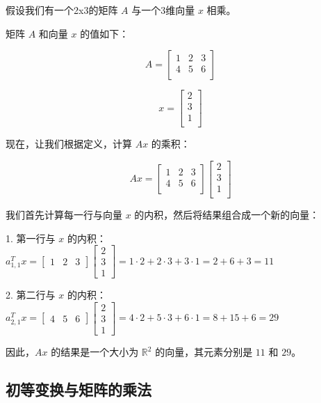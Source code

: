 \begin{exercise}
    假设我们有一个2x3的矩阵 $A$ 与一个3维向量 $x$ 相乘。

矩阵 $A$ 和向量 $x$ 的值如下：

\[
A = \begin{bmatrix}
1 & 2 & 3 \\
4 & 5 & 6 \\
\end{bmatrix}
\]

\[
x = \begin{bmatrix}
2 \\
3 \\
1 \\
\end{bmatrix}
\]

现在，让我们根据定义，计算 $Ax$ 的乘积：

\[
Ax = \begin{bmatrix}
1 & 2 & 3 \\
4 & 5 & 6 \\
\end{bmatrix} \begin{bmatrix}
2 \\
3 \\
1 \\
\end{bmatrix}
\]

我们首先计算每一行与向量 $x$ 的内积，然后将结果组合成一个新的向量：

1. 第一行与 $x$ 的内积： $a_{1,1}^T x = \begin{bmatrix} 1 & 2 & 3 \end{bmatrix} \begin{bmatrix} 2 \\ 3 \\ 1 \end{bmatrix} = 1 \cdot 2 + 2 \cdot 3 + 3 \cdot 1 = 2 + 6 + 3 = 11$

2. 第二行与 $x$ 的内积： $a_{2,1}^T x = \begin{bmatrix} 4 & 5 & 6 \end{bmatrix} \begin{bmatrix} 2 \\ 3 \\ 1 \end{bmatrix} = 4 \cdot 2 + 5 \cdot 3 + 6 \cdot 1 = 8 + 15 + 6 = 29$

因此，$Ax$ 的结果是一个大小为 $\mathbb{R}^2$ 的向量，其元素分别是 $11$ 和 $29$。
\end{exercise}

\subsection{初等变换与矩阵的乘法}

